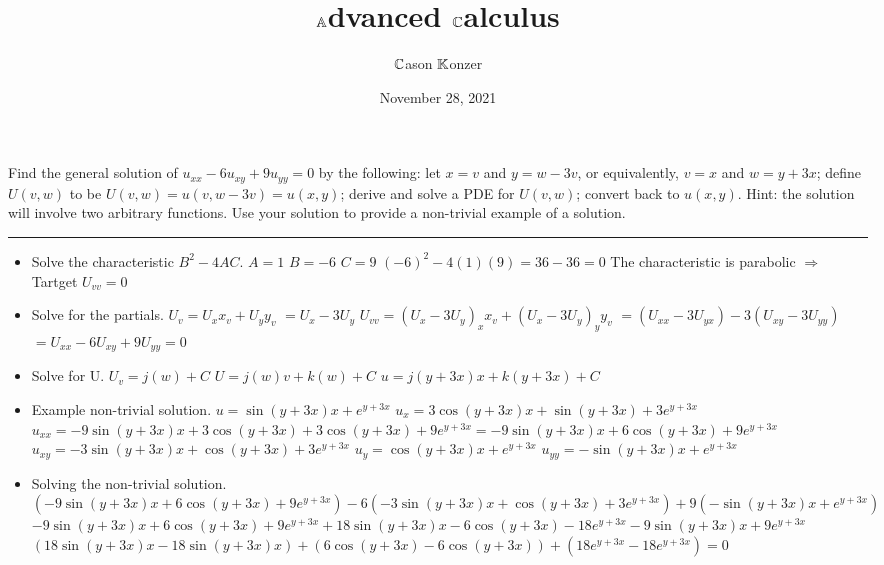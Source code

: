 \documentclass[10pt]{article}
\title{$\mathbb{A}$dvanced $\mathbb{C}$alculus}
\author{$\mathbb{C}$ason $\mathbb{K}$onzer}
\date{November 28, 2021}
\begin{document}
\maketitle

\newpage

\section{\underline{}}
\label{sec: Problem 1}

\noindent
Find the general solution of $ u_{xx} - 6u_{xy} + 9u_{yy} = 0 $ by the following:
let $ x = v $ and $ y = w - 3v $, or equivalently, $ v = x $ and $ w = y + 3x $;
define $ U(v,w) $ to be $ U(v,w) = u(v,w-3v) = u(x,y) $;
derive and solve a PDE for $ U(v,w) $;
convert back to $ u(x,y) $.
Hint: the solution will involve two arbitrary functions.
Use your solution to provide a non-trivial example of a solution. \\
\vspace{2.5mm}

\hrule

\vspace{7.5mm}

\begin{itemize}
    \item Solve the characteristic $ B^2 - 4AC $.
    \subitem $ A = 1 $
    \subitem $ B = -6 $
    \subitem $ C = 9 $
    \subitem $ (-6)^2 - 4(1)(9) = 36 - 36 = 0 $
    \subsubitem The characteristic is parabolic $ \Rightarrow  $ Tartget $ U_{vv} = 0 $
    \item Solve for the partials.
    \subitem $ U_{v} = U_{x}x_{v} + U_{y}y_{v} $
    \subsubitem $ = U_{x} - 3U_{y} $
    \subitem $ U_{vv} = (U_{x} - 3U_{y})_{x}x_{v} + (U_{x} - 3U_{y})_{y}y_{v} $
    \subsubitem $ = (U_{xx} - 3U_{yx}) - 3(U_{xy} - 3U_{yy}) $
    \subsubitem $ = U_{xx} - 6U_{xy} + 9U_{yy} = 0 $
    \item Solve for U.
    \subitem $ U_{v} = j(w) + C $
    \subitem $ U = j(w)v + k(w) + C $
    \subitem $ u = j(y + 3x)x + k(y + 3x) + C $
    \item Example non-trivial solution.
    \subitem $ u = \sin(y + 3x)x + e^{y + 3x} $
    \subitem $ u_{x} = 3\cos(y + 3x)x + \sin(y + 3x) + 3e^{y + 3x} $
    \subitem $ u_{xx} = -9\sin(y + 3x)x + 3\cos(y + 3x) + 3\cos(y + 3x) + 9e^{y + 3x} = -9\sin(y + 3x)x + 6\cos(y + 3x) + 9e^{y + 3x} $
    \subitem $ u_{xy} = -3\sin(y + 3x)x + \cos(y + 3x) + 3e^{y + 3x} $
    \subitem $ u_{y} = \cos(y + 3x)x + e^{y + 3x} $
    \subitem $ u_{yy} = -\sin(y + 3x)x + e^{y + 3x} $
    \item Solving the non-trivial solution.
    \subitem $ (-9\sin(y + 3x)x + 6\cos(y + 3x) + 9e^{y + 3x}) - 6(-3\sin(y + 3x)x + \cos(y + 3x) + 3e^{y + 3x}) + 9(-\sin(y + 3x)x + e^{y + 3x}) $
    \subitem $ -9\sin(y + 3x)x + 6\cos(y + 3x) + 9e^{y + 3x} + 18\sin(y + 3x)x - 6\cos(y + 3x) - 18e^{y + 3x} - 9\sin(y + 3x)x + 9e^{y + 3x} $
    \subitem $ (18\sin(y + 3x)x - 18\sin(y + 3x)x) + (6\cos(y + 3x) - 6\cos(y + 3x)) + (18e^{y + 3x} - 18e^{y + 3x}) = 0 $
\end{itemize}
\end{document}
